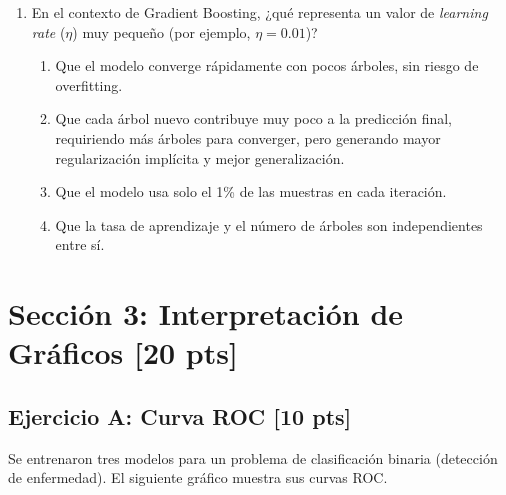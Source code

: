 \documentclass[11pt,a4paper]{article}
\newcommand{\puntaje}[1]{\textbf{[#1 pts]}}
\begin{document}
\begin{enumerate}[label=\textbf{\arabic*.}, leftmargin=*, itemsep=20pt]
\item En el contexto de Gradient Boosting, ¿qu\'e representa un valor de \textit{learning rate} ($\eta$) muy peque\~no (por ejemplo, $\eta = 0.01$)?

\begin{enumerate}[label=\alph*)]
  \item Que el modelo converge r\'apidamente con pocos \'arboles, sin riesgo de overfitting.
  \item Que cada \'arbol nuevo contribuye muy poco a la predicci\'on final, requiriendo m\'as \'arboles para converger, pero generando mayor regularizaci\'on impl\'icita y mejor generalizaci\'on.
  \item Que el modelo usa solo el 1\% de las muestras en cada iteraci\'on.
  \item Que la tasa de aprendizaje y el n\'umero de \'arboles son independientes entre s\'i.
\end{enumerate}

\end{enumerate}

\vspace{0.5cm}

\section*{Secci\'on 3: Interpretaci\'on de Gr\'aficos \puntaje{20}}

\subsection*{Ejercicio A: Curva ROC \puntaje{10}}

Se entrenaron tres modelos para un problema de clasificaci\'on binaria (detecci\'on de enfermedad). El siguiente gr\'afico muestra sus curvas ROC.

\vspace{0.3cm}
\begin{center}
\end{center}
\end{document}
